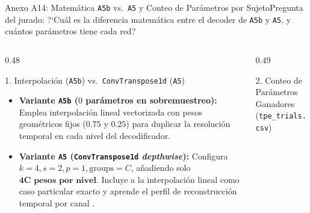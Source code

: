 \begin{frame}{Anexo A14: Matem\'atica \texttt{A5b} vs.\ \texttt{A5} y Conteo de Par\'ametros por Sujeto}{Pregunta del jurado: ?`Cu\'al es la diferencia matem\'atica entre el decoder de \texttt{A5b} y \texttt{A5}, y cu\'antos par\'ametros tiene cada red?}
  \label{anexo:a5b_vs_a5_params}
  \begin{columns}[T,onlytextwidth]
    \begin{column}{0.48\textwidth}
      \begin{block}{1. Interpolaci\'on (\texttt{A5b}) vs.\ \texttt{ConvTranspose1d} (\texttt{A5})}
        \scriptsize
        \begin{itemize}\setlength{\itemsep}{3pt}
          \item \textbf{Variante \texttt{A5b} ($0$ par\'ametros en sobremuestreo):} Emplea interpolaci\'on lineal vectorizada con pesos geom\'etricos fijos ($0.75$ y $0.25$) para duplicar la resoluci\'on temporal en cada nivel del decodificador.
          \item \textbf{Variante \texttt{A5} (\texttt{ConvTranspose1d} \textit{depthwise}):} Configura $k=4, s=2, p=1, \text{groups}=C$, a\~nadiendo solo $\mathbf{4C\text{ pesos por nivel}}$. Incluye a la interpolaci\'on lineal como caso particular exacto y aprende el perfil de reconstrucci\'on temporal por canal \cite{rodas_valencia_tpe_ecog}.
        \end{itemize}
      \end{block}
    \end{column}

    \begin{column}{0.49\textwidth}
      \begin{block}{2. Conteo de Par\'ametros Ganadores (\texttt{tpe\_trials.csv})}
        \centering
        \vspace{1mm}


\end{block}
\end{column}
\end{columns}
\end{frame}
